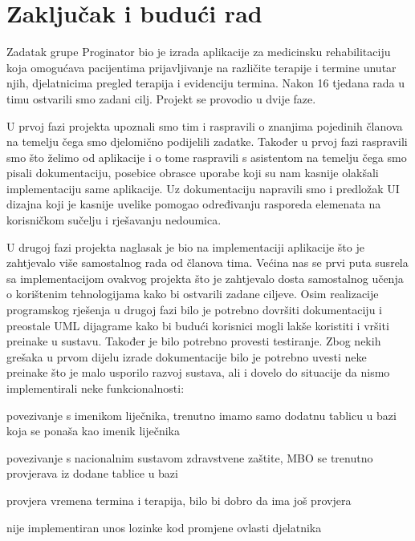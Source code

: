 \chapter{Zaključak i budući rad}
		 
		 Zadatak grupe Proginator bio je izrada aplikacije za medicinsku rehabilitaciju koja omogućava pacijentima prijavljivanje na različite terapije i termine unutar njih, djelatnicima pregled terapija i evidenciju termina. Nakon 16 tjedana rada u timu ostvarili smo zadani cilj. Projekt se provodio u dvije faze.
		 
		 U prvoj fazi projekta upoznali smo tim i raspravili o znanjima pojedinih članova na temelju čega smo djelomično podijelili zadatke. Također u prvoj fazi raspravili smo što želimo od aplikacije i o tome raspravili s asistentom na temelju čega smo pisali dokumentaciju, posebice obrasce uporabe koji su nam kasnije olakšali implementaciju same aplikacije. Uz dokumentaciju napravili smo i predložak UI dizajna koji je kasnije uvelike pomogao određivanju rasporeda elemenata na korisničkom sučelju i rješavanju nedoumica.
		 
		 U drugoj fazi projekta naglasak je bio na implementaciji aplikacije što je zahtjevalo više samostalnog rada od članova tima. Većina nas se prvi puta susrela sa implementacijom ovakvog projekta što je zahtjevalo dosta samostalnog učenja o korištenim tehnologijama kako bi ostvarili zadane ciljeve. Osim realizacije programskog rješenja u drugoj fazi bilo je potrebno dovršiti dokumentaciju i preostale UML dijagrame kako bi budući korisnici mogli lakše koristiti i vršiti preinake u sustavu. Također je bilo potrebno provesti testiranje. Zbog nekih grešaka u prvom dijelu izrade dokumentacije bilo je potrebno uvesti neke preinake što je malo usporilo razvoj sustava, ali i dovelo do situacije da nismo implementirali neke funkcionalnosti:
		 \begin{packed_enum}
		 	
		 	\item[-] povezivanje s imenikom liječnika, trenutno imamo samo dodatnu tablicu u bazi koja se ponaša kao imenik liječnika
		 	\item[-] povezivanje s nacionalnim sustavom zdravstvene zaštite, MBO se trenutno provjerava iz dodane tablice u bazi
		 	\item[-] provjera vremena termina i terapija, bilo bi dobro da ima još provjera
		 	\item[-] nije implementiran unos lozinke kod promjene ovlasti djelatnika
		 \end{packed_enum}
		 
